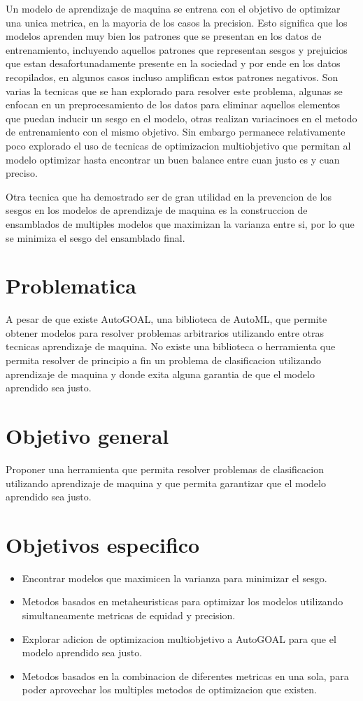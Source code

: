 Un modelo de aprendizaje de maquina se entrena con el objetivo de optimizar una unica metrica, en la mayoria de los casos la precision. Esto significa que los modelos aprenden muy bien los patrones que se presentan en los datos de entrenamiento, incluyendo aquellos patrones que representan sesgos y prejuicios que estan desafortunadamente presente en la sociedad y por ende en los datos recopilados, en algunos casos incluso amplifican estos patrones negativos. Son varias la tecnicas que se han explorado para resolver este problema, algunas se enfocan en un preprocesamiento de los datos para eliminar aquellos elementos que puedan inducir un sesgo en el modelo, otras realizan variacinoes en el metodo de entrenamiento con el mismo objetivo. Sin embargo permanece relativamente poco explorado el uso de tecnicas de optimizacion multiobjetivo que permitan al modelo optimizar hasta encontrar un buen balance entre cuan justo es y cuan preciso.

Otra tecnica que ha demostrado ser de gran utilidad en la prevencion de los sesgos en los modelos de aprendizaje de maquina es la construccion de ensamblados de multiples modelos que maximizan la varianza entre si, por lo que se minimiza el sesgo del ensamblado final.

\section*{Problematica}

A pesar de que existe AutoGOAL, una biblioteca de AutoML, que permite obtener modelos para resolver problemas arbitrarios utilizando entre otras tecnicas aprendizaje de maquina. No existe una biblioteca o herramienta que permita resolver de principio a fin un problema de clasificacion utilizando aprendizaje de maquina y donde exita alguna garantia de que el modelo aprendido sea justo.

\section*{Objetivo general}

Proponer una herramienta que permita resolver problemas de clasificacion utilizando aprendizaje de maquina y que permita garantizar que el modelo aprendido sea justo.

\section*{Objetivos especifico}

\begin{itemize}
    \item Encontrar modelos que maximicen la varianza para minimizar el sesgo.
    \item Metodos basados en metaheuristicas para optimizar los modelos utilizando simultaneamente metricas de equidad y precision.
    \item Explorar adicion de optimizacion multiobjetivo a AutoGOAL para que el modelo aprendido sea justo.
    \item Metodos basados en la combinacion de diferentes metricas en una sola, para poder aprovechar los multiples metodos de optimizacion que existen.
\end{itemize}

